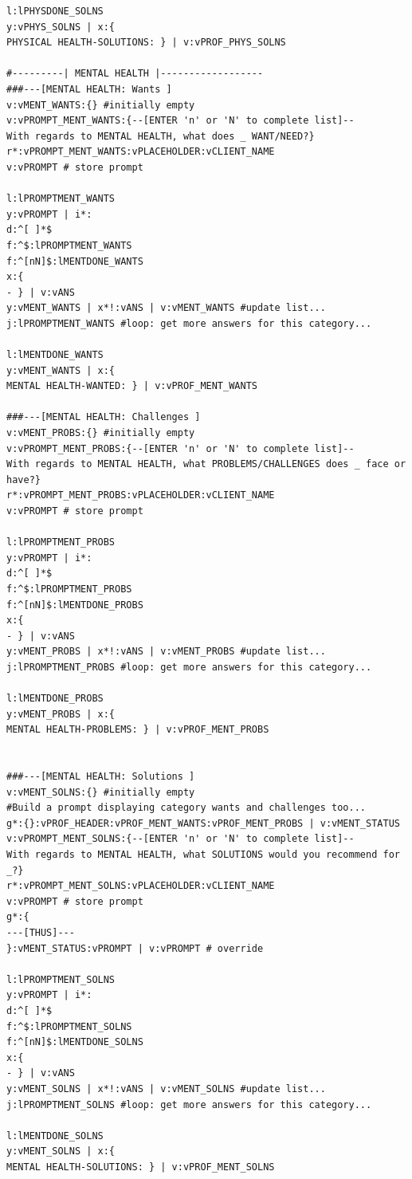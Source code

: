 \documentclass[a4paper, 18pt]{book} %
\begin{document}
{\begin{tcolorbox}[teaterminalstyle, title=TEA EXAMPLE: MENTAL HEALTH DIAGNOSIS PROGRAM v1.0.0.1, breakable]
\begin{lstlisting}[language=TEA,breaklines=true]
l:lPHYSDONE_SOLNS
y:vPHYS_SOLNS | x:{
PHYSICAL HEALTH-SOLUTIONS: } | v:vPROF_PHYS_SOLNS

#---------| MENTAL HEALTH |------------------
###---[MENTAL HEALTH: Wants ]
v:vMENT_WANTS:{} #initially empty
v:vPROMPT_MENT_WANTS:{--[ENTER 'n' or 'N' to complete list]--
With regards to MENTAL HEALTH, what does _ WANT/NEED?}
r*:vPROMPT_MENT_WANTS:vPLACEHOLDER:vCLIENT_NAME
v:vPROMPT # store prompt

l:lPROMPTMENT_WANTS
y:vPROMPT | i*:
d:^[ ]*$
f:^$:lPROMPTMENT_WANTS
f:^[nN]$:lMENTDONE_WANTS
x:{
- } | v:vANS
y:vMENT_WANTS | x*!:vANS | v:vMENT_WANTS #update list...
j:lPROMPTMENT_WANTS #loop: get more answers for this category...

l:lMENTDONE_WANTS
y:vMENT_WANTS | x:{
MENTAL HEALTH-WANTED: } | v:vPROF_MENT_WANTS 

###---[MENTAL HEALTH: Challenges ]
v:vMENT_PROBS:{} #initially empty
v:vPROMPT_MENT_PROBS:{--[ENTER 'n' or 'N' to complete list]--
With regards to MENTAL HEALTH, what PROBLEMS/CHALLENGES does _ face or have?}
r*:vPROMPT_MENT_PROBS:vPLACEHOLDER:vCLIENT_NAME
v:vPROMPT # store prompt

l:lPROMPTMENT_PROBS
y:vPROMPT | i*:
d:^[ ]*$
f:^$:lPROMPTMENT_PROBS
f:^[nN]$:lMENTDONE_PROBS
x:{
- } | v:vANS
y:vMENT_PROBS | x*!:vANS | v:vMENT_PROBS #update list...
j:lPROMPTMENT_PROBS #loop: get more answers for this category...

l:lMENTDONE_PROBS
y:vMENT_PROBS | x:{
MENTAL HEALTH-PROBLEMS: } | v:vPROF_MENT_PROBS


###---[MENTAL HEALTH: Solutions ]
v:vMENT_SOLNS:{} #initially empty
#Build a prompt displaying category wants and challenges too...
g*:{}:vPROF_HEADER:vPROF_MENT_WANTS:vPROF_MENT_PROBS | v:vMENT_STATUS
v:vPROMPT_MENT_SOLNS:{--[ENTER 'n' or 'N' to complete list]--
With regards to MENTAL HEALTH, what SOLUTIONS would you recommend for _?}
r*:vPROMPT_MENT_SOLNS:vPLACEHOLDER:vCLIENT_NAME
v:vPROMPT # store prompt
g*:{
---[THUS]---
}:vMENT_STATUS:vPROMPT | v:vPROMPT # override

l:lPROMPTMENT_SOLNS
y:vPROMPT | i*:
d:^[ ]*$
f:^$:lPROMPTMENT_SOLNS
f:^[nN]$:lMENTDONE_SOLNS
x:{
- } | v:vANS
y:vMENT_SOLNS | x*!:vANS | v:vMENT_SOLNS #update list...
j:lPROMPTMENT_SOLNS #loop: get more answers for this category...

l:lMENTDONE_SOLNS
y:vMENT_SOLNS | x:{
MENTAL HEALTH-SOLUTIONS: } | v:vPROF_MENT_SOLNS



\end{lstlisting}
\end{tcolorbox}}
\end{document}
